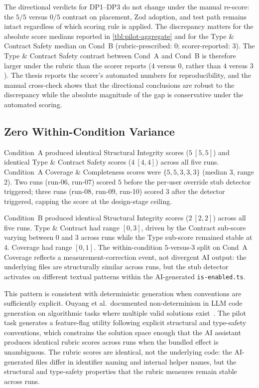 \documentclass[12pt,a4paper]{report}
\DeclareRobustCommand{\filename}[1]{\bgroup\urlstyle{tt}\nolinkurl{#1}\egroup}
\begin{document}
The directional verdicts for DP1--DP3 do not change under the manual re-score: the $5/5$ versus $0/5$ contrast on placement, Zod adoption, and test path remains intact regardless of which scoring rule is applied. The discrepancy matters for the absolute score medians reported in \autoref{tbl:pilot-aggregate} and for the Type \& Contract Safety median on Cond~B (rubric-prescribed: $0$; scorer-reported: $3$). The Type \& Contract Safety contrast between Cond~A and Cond~B is therefore larger under the rubric than the scorer reports ($4$ versus $0$, rather than $4$ versus $3$). The thesis reports the scorer's automated numbers for reproducibility, and the manual cross-check shows that the directional conclusions are robust to the discrepancy while the absolute magnitude of the gap is conservative under the automated scoring.

\subsection{Zero Within-Condition Variance}
\label{sec:zero-variance}

Condition~A produced identical Structural Integrity scores ($5\ [5, 5]$) and identical Type \& Contract Safety scores ($4\ [4, 4]$) across all five runs. Condition~A Coverage \& Completeness scores were $\{5, 5, 3, 3, 3\}$ (median $3$, range $2$). Two runs (run-06, run-07) scored $5$ before the per-user override stub detector triggered; three runs (run-08, run-09, run-10) scored $3$ after the detector triggered, capping the score at the design-stage ceiling.

Condition~B produced identical Structural Integrity scores ($2\ [2, 2]$) across all five runs. Type \& Contract had range $[0, 3]$, driven by the Contract sub-score varying between 0 and 3 across runs while the Type sub-score remained stable at 4. Coverage had range $[0, 1]$. The within-condition $5$-versus-$3$ split on Cond~A Coverage reflects a measurement-correction event, not divergent AI output: the underlying files are structurally similar across runs, but the stub detector activates on different textual patterns within the AI-generated \filename{is-enabled.ts}.

This pattern is consistent with deterministic generation when conventions are sufficiently explicit. Ouyang et al.\ documented non-determinism in LLM code generation on algorithmic tasks where multiple valid solutions exist~\parencite{ouyang2025nondeterminism}. The pilot task generates a feature-flag utility following explicit structural and type-safety conventions, which constrains the solution space enough that the AI assistant produces identical rubric scores across runs when the bundled effect is unambiguous. The rubric scores are identical, not the underlying code: the AI-generated files differ in identifier naming and internal helper names, but the structural and type-safety properties that the rubric measures remain stable across runs.
\end{document}
